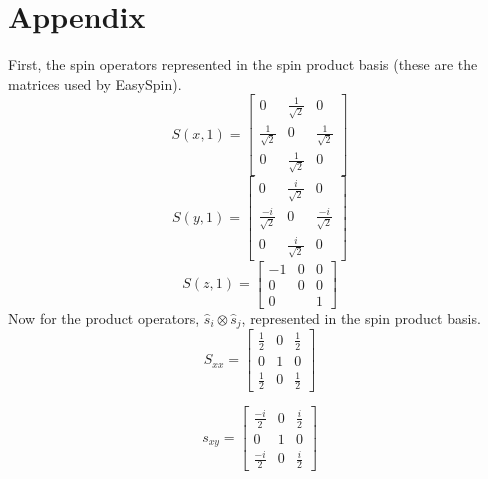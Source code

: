 \documentclass[12pt]{article}
\begin{document}
\section{Appendix}
First, the spin operators represented in the spin product basis (these are the
matrices used by EasySpin).
\begin{equation}
S(x,1) = 
\begin{bmatrix}
0                  & \frac{1}{\sqrt{2}} & 0\\
\frac{1}{\sqrt{2}} & 0                 & \frac{1}{\sqrt{2}} \\ 
0                  & \frac{1}{\sqrt{2}} & 0
\end{bmatrix}
\end{equation}
\begin{equation}
S(y,1) = 
\begin{bmatrix}
0                  & \frac{i}{\sqrt{2}} & 0\\
\frac{-i}{\sqrt{2}} & 0                 & \frac{-i}{\sqrt{2}} \\ 
0                  & \frac{i}{\sqrt{2}} & 0
\end{bmatrix}
\end{equation}
\begin{equation}
S(z,1) = 
\begin{bmatrix}
-1                  & 0 & 0\\
0 & 0               & 0    \\ 
0                   &   & 1
\end{bmatrix}
\end{equation}
\noindent Now for the product operators, $\hat{s}_{i}\otimes\hat{s}_{j}$,
represented in the spin product basis.
\begin{equation}
S_{xx} = 
\begin{bmatrix}
\frac{1}{2} & 0  & \frac{1}{2} \\ 
0           & 1 & 0\\
\frac{1}{2} & 0  & \frac{1}{2} 
\end{bmatrix}
\end{equation}

\begin{equation}
s_{xy} = 
\begin{bmatrix}
\frac{-i}{2} & 0  & \frac{i}{2} \\ 
0           & 1 & 0\\
\frac{-i}{2} & 0  & \frac{i}{2} 
\end{bmatrix}
\end{equation}
\end{document}
